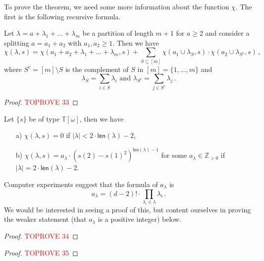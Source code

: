 \documentclass[authorcolumns,numberwithinsect]{no-lipics-v2022}
\begin{document}
To prove the theorem, we need some more information about the function $\chi$. The first is the following recursive formula.

\begin{lemma} \label{Lem:chi_recursion}
Let $\lambda = a + \lambda_1 + \ldots + \lambda_m$ be a partition of length $m+1$ for $a \geq 2$ and consider a splitting $a  = a_1 + a_2$ with $a_1, a_2 \geq 1$. Then we have
\begin{equation}  \label{eqn:chi_recursion}
\chi(\lambda, s) = \chi(a_1 + a_2 + \lambda_1 + \ldots + \lambda_m, s) + \sum_{S \subseteq [m]} \chi(a_1 \cup \lambda_S, s) \cdot \chi(a_2 \cup \lambda_{S^c}, s)\,,
\end{equation}
where $S^c = [m] \setminus S$ is the complement of $S$ in $[m]=\{1, \ldots, m\}$ and
\[
\lambda_S = \sum_{i \in S} \lambda_i \text{ and } \lambda_{S^c} = \sum_{j \in S^c} \lambda_j\,.
\]
\end{lemma}
\begin{proof}\textcolor{red}{TOPROVE 33}\end{proof}


\begin{proposition} \label{Prop:chi_vanishing_property}
Let $\{s\}$ be of type $\mathbb{T}[\omega]$, then
we have
\begin{enumerate}
    \item[a)] $\chi(\lambda, s) = 0$ if $|\lambda| < 2\cdot  \mathsf{len}(\lambda)-2$,
    \item[b)] $\chi(\lambda, s) = a_\lambda \cdot (s(2)-s(1)^2)^{\mathsf{len}(\lambda)-1}$ for some $a_\lambda \in \mathbb{Z}_{>0}$ if $|\lambda| = 2 \cdot \mathsf{len}(\lambda)-2$.
\end{enumerate}
\end{proposition}
\begin{remark}
Computer experiments suggest that the formula of $a_\lambda$ is
\begin{equation}
a_\lambda = (d-2)! \cdot \prod_{\lambda_i \in \lambda} \lambda_i\,.
\end{equation}
We would be interested in seeing a proof of this, but content ourselves in proving the weaker statement (that $a_\lambda$ is a positive integer) below.
\end{remark}
\begin{proof}\textcolor{red}{TOPROVE 34}\end{proof}



\begin{proof}\textcolor{red}{TOPROVE 35}\end{proof}
\end{document}
